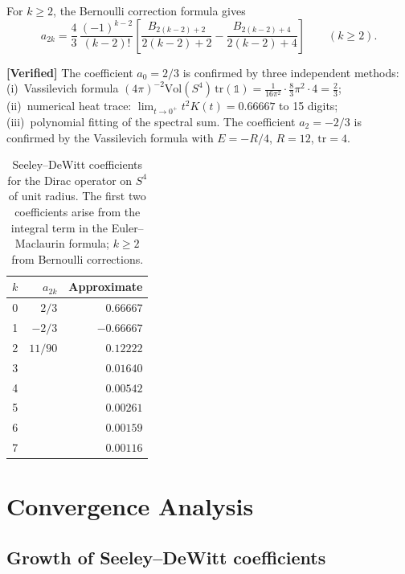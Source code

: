 \documentclass[11pt,a4paper]{article}
\newcommand{\Id}{\mathbb{1}}
\theoremstyle{plain}
\theoremstyle{definition}
\newcommand{\verified}[1]{%
  \par\smallskip\noindent
  \colorbox{green!10}{\parbox{\dimexpr\linewidth-2\fboxsep}{%
    \textcolor{green!50!black}{\textbf{[Verified]}} #1}}%
  \par\smallskip}
\begin{document}
For $k \geq 2$, the Bernoulli correction formula gives
\begin{equation}\label{eq:bernoulli-coeff}
  a_{2k} = \frac{4}{3}\,\frac{(-1)^{k-2}}{(k-2)!}
  \left[\frac{B_{2(k-2)+2}}{2(k-2)+2} - \frac{B_{2(k-2)+4}}{2(k-2)+4}\right]
  \qquad (k \geq 2).
\end{equation}

\verified{The coefficient $a_0 = 2/3$ is confirmed by three independent methods:
(i)~Vassilevich formula $(4\pi)^{-2}\mathrm{Vol}(S^4)\,\mathrm{tr}(\Id)
= \tfrac{1}{16\pi^2}\cdot\tfrac{8}{3}\pi^2\cdot 4 = \tfrac{2}{3}$;
(ii)~numerical heat trace: $\lim_{t\to 0^+} t^2 K(t) = 0.66667$ to 15 digits;
(iii)~polynomial fitting of the spectral sum.
The coefficient $a_2 = -2/3$ is confirmed by the Vassilevich formula with
$E = -R/4$, $R = 12$, $\mathrm{tr} = 4$.}

\begin{table}[h]
\centering
\begin{tabular}{crr}
\toprule
$k$ & $a_{2k}$ & Approximate \\
\midrule
0 & $2/3$ & $0.66667$ \\
1 & $-2/3$ & $-0.66667$ \\
2 & $11/90$ & $0.12222$ \\
3 &  & $0.01640$ \\
4 &  & $0.00542$ \\
5 &  & $0.00261$ \\
6 &  & $0.00159$ \\
7 &  & $0.00116$ \\
\bottomrule
\end{tabular}
\caption{Seeley--DeWitt coefficients for the Dirac operator on $S^4$
of unit radius.  The first two coefficients arise from the integral
term in the Euler--Maclaurin formula; $k \geq 2$ from Bernoulli corrections.}
\label{tab:sdw-coefficients}
\end{table}


\section{Convergence Analysis}\label{sec:convergence}

\subsection{Growth of Seeley--DeWitt coefficients}
\end{document}
